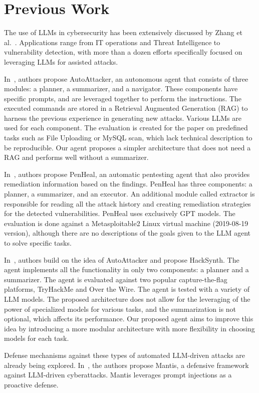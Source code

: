 \section{Previous Work}
\label{sec-previouswork}

The use of LLMs in cybersecurity has been extensively discussed by Zhang et al.~\cite{zhang_when_2025}. Applications range from IT operations and Threat Intelligence to vulnerability detection, with more than a dozen efforts specifically focused on leveraging LLMs for assisted attacks.

In~\cite{xu_autoattacker_2024}, authors propose AutoAttacker, an autonomous agent that consists of three modules: a planner, a summarizer, and a navigator. These components have specific prompts, and are leveraged together to perform the instructions. The executed commands are stored in a Retrieval Augmented Generation (RAG) to harness the previous experience in generating new attacks. Various LLMs are used for each component. The evaluation is created for the paper on predefined tasks such as File Uploading or MySQL scan, which lack technical description to be reproducible. Our agent proposes a simpler architecture that does not need a RAG and performs well without a summarizer.

In~\cite{huang_penheal_2023}, authors propose PenHeal, an automatic pentesting agent that also provides remediation information based on the findings. PenHeal has three components: a planner, a summarizer, and an executor. An additional module called extractor is responsible for reading all the attack history and creating remediation strategies for the detected vulnerabilities. PenHeal uses exclusively GPT models. The evaluation is done against a Metasploitable2 Linux virtual machine (2019-08-19 version), although there are no descriptions of the goals given to the LLM agent to solve specific tasks.

In~\cite{muzsai_hacksynth_2024}, authors build on the idea of AutoAttacker and propose HackSynth. The agent implements all the functionality in only two components: a planner and a summarizer. The agent is evaluated against two popular capture-the-flag platforms, TryHackMe and Over the Wire. The agent is tested with a variety of LLM models. The proposed architecture does not allow for the leveraging of the power of specialized models for various tasks, and the summarization is not optional, which affects its performance. Our proposed agent aims to improve this idea by introducing a more modular architecture with more flexibility in choosing models for each task.

Defense mechanisms against these types of automated LLM-driven attacks are already being explored. In~\cite{pasquini_hacking_2024}, the authors propose Mantis, a defensive framework against LLM-driven cyberattacks. Mantis leverages prompt injections as a proactive defense.

